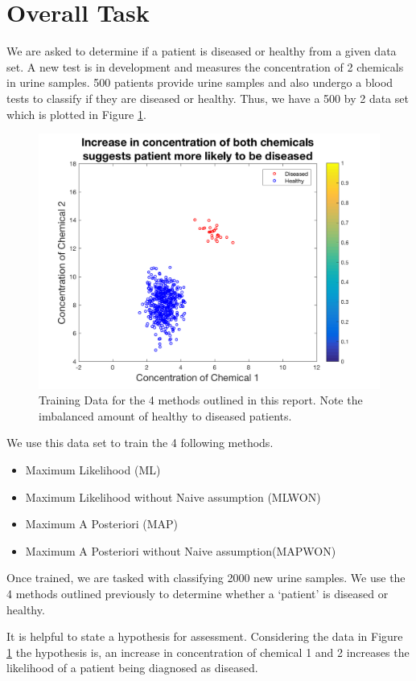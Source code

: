 \section{Overall Task}
We are asked to determine if a patient is diseased or healthy from a given data set. A new test is in development and measures the concentration of 2 chemicals in urine samples. 500 patients provide urine samples and also undergo a blood tests to classify if they are diseased or healthy. Thus, we have a 500 by 2 data set which is plotted in Figure \ref{fig:trainingData}. 

\begin{figure}[h]
	\centering
	\includegraphics[width=0.8\linewidth]{images/MLtrainingData}
	\caption{Training Data for the 4 methods outlined in this report. Note the imbalanced amount of healthy to diseased patients.}
	\label{fig:trainingData}
\end{figure}

We use this data set to train the 4 following methods.

\begin{itemize}
	\item Maximum Likelihood (ML)
	\item Maximum Likelihood without Naive assumption (MLWON)
	\item Maximum A Posteriori (MAP)
	\item Maximum A Posteriori without Naive assumption(MAPWON)
\end{itemize}

Once trained, we are tasked with classifying 2000 new urine samples. We use the 4 methods outlined previously to determine whether a `patient' is diseased or healthy.

It is helpful to state a hypothesis for assessment. Considering the data in Figure \ref{fig:trainingData} the hypothesis is, an increase in concentration of chemical 1 and 2 increases the likelihood of a patient being diagnosed as diseased.

